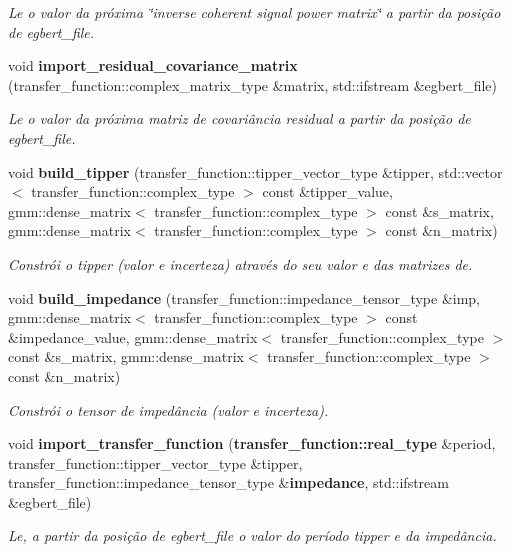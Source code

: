 \begin{CompactItemize}
\begin{CompactList}\small\item\em Le o valor da próxima \char`\"{}inverse coherent signal power matrix\char`\"{} a partir da posição de {\em egbert\_\-file\/}. \item\end{CompactList}\item 
void {\bf import\_\-residual\_\-covariance\_\-matrix} (transfer\_\-function::complex\_\-matrix\_\-type \&matrix, std::ifstream \&egbert\_\-file)
\begin{CompactList}\small\item\em Le o valor da próxima matriz de covariância residual a partir da posição de {\em egbert\_\-file\/}. \item\end{CompactList}\item 
void {\bf build\_\-tipper} (transfer\_\-function::tipper\_\-vector\_\-type \&tipper, std::vector$<$ transfer\_\-function::complex\_\-type $>$ const \&tipper\_\-value, gmm::dense\_\-matrix$<$ transfer\_\-function::complex\_\-type $>$ const \&s\_\-matrix, gmm::dense\_\-matrix$<$ transfer\_\-function::complex\_\-type $>$ const \&n\_\-matrix)
\begin{CompactList}\small\item\em Constrói o tipper (valor e incerteza) através do seu valor e das matrizes de. \item\end{CompactList}\item 
void {\bf build\_\-impedance} (transfer\_\-function::impedance\_\-tensor\_\-type \&imp, gmm::dense\_\-matrix$<$ transfer\_\-function::complex\_\-type $>$ const \&impedance\_\-value, gmm::dense\_\-matrix$<$ transfer\_\-function::complex\_\-type $>$ const \&s\_\-matrix, gmm::dense\_\-matrix$<$ transfer\_\-function::complex\_\-type $>$ const \&n\_\-matrix)
\begin{CompactList}\small\item\em Constrói o tensor de impedância (valor e incerteza). \item\end{CompactList}\item 
void {\bf import\_\-transfer\_\-function} ({\bf transfer\_\-function::real\_\-type} \&period, transfer\_\-function::tipper\_\-vector\_\-type \&tipper, transfer\_\-function::impedance\_\-tensor\_\-type \&{\bf impedance}, std::ifstream \&egbert\_\-file)
\begin{CompactList}\small\item\em Le, a partir da posição de {\em egbert\_\-file\/} o valor do período tipper e da impedância. \item\end{CompactList}\end{CompactItemize}


